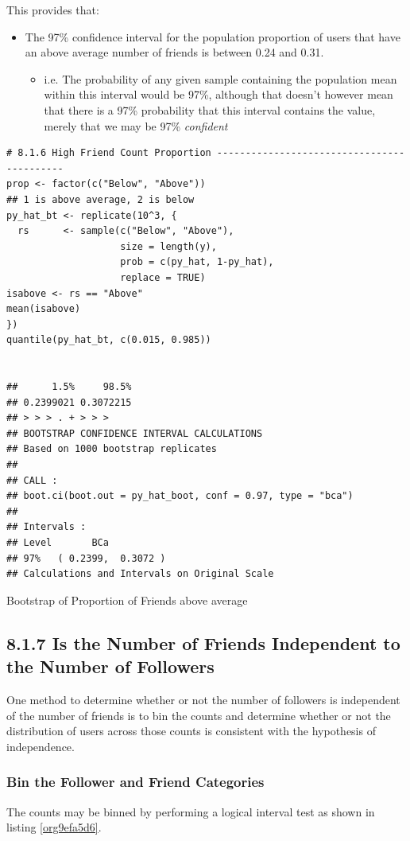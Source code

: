 \documentclass[11pt]{article}
\begin{document}
This provides that:
\begin{itemize}
\item The 97\% confidence interval for the population proportion of users that have an above average number of friends is between 0.24 and 0.31.
\begin{itemize}
\item i.e. The probability of any given sample containing the population mean within this interval would be 97\%, although  that doesn't however mean that there is a 97\% probability that this interval contains the value, merely that we may be 97\% \emph{confident}
\end{itemize}
\end{itemize}

\begin{listing}[htbp]
\begin{verbatim}
# 8.1.6 High Friend Count Proportion -------------------------------------------
prop <- factor(c("Below", "Above"))
## 1 is above average, 2 is below
py_hat_bt <- replicate(10^3, {
  rs      <- sample(c("Below", "Above"),
                    size = length(y),
                    prob = c(py_hat, 1-py_hat),
                    replace = TRUE)
isabove <- rs == "Above"
mean(isabove)
})
quantile(py_hat_bt, c(0.015, 0.985))


##      1.5%     98.5%
## 0.2399021 0.3072215
## > > > . + > > >
## BOOTSTRAP CONFIDENCE INTERVAL CALCULATIONS
## Based on 1000 bootstrap replicates
##
## CALL :
## boot.ci(boot.out = py_hat_boot, conf = 0.97, type = "bca")
##
## Intervals :
## Level       BCa
## 97%   ( 0.2399,  0.3072 )
## Calculations and Intervals on Original Scale
\end{verbatim}
\caption{\label{org36a93e3}Bootstrap of Proportion of Friends above average}
\end{listing}
\subsection{8.1.7 Is the Number of Friends Independent to the Number of Followers}
\label{sec:org6bb22e6}
One method to determine whether or not the number of followers is independent of the number of friends is to bin the counts and determine whether or not the distribution of users across those counts is consistent with the hypothesis of independence.

\subsubsection{Bin the Follower and Friend Categories}
\label{sec:orge3de306}
The counts may be binned by performing a logical interval test as shown in listing \ref{org9efa5d6}.
\end{document}
